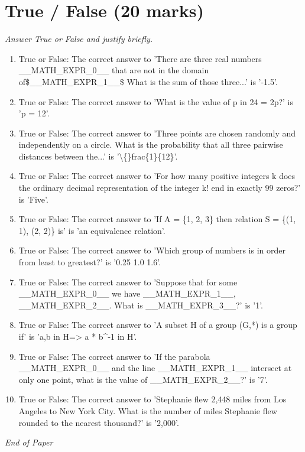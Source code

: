 \documentclass[12pt]{article}
\begin{document}
\section*{True / False (20 marks)}
\textit{Answer True or False and justify briefly.}
\begin{enumerate}[label=\arabic*.]
\item True or False: The correct answer to 'There are three real numbers \_\_MATH\_EXPR\_0\_\_ that are not in the domain of\$\_\_MATH\_EXPR\_1\_\_\$ What is the sum of those three...' is '-1.5'.
\item True or False: The correct answer to 'What is the value of p in 24 = 2p?' is 'p = 12'.
\item True or False: The correct answer to 'Three points are chosen randomly and independently on a circle. What is the probability that all three pairwise distances between the...' is '\textbackslash\{\}frac\{1\}\{12\}'.
\item True or False: The correct answer to 'For how many positive integers k does the ordinary decimal representation of the integer k! end in exactly 99 zeros?' is 'Five'.
\item True or False: The correct answer to 'If A = \{1, 2, 3\} then relation S = \{(1, 1), (2, 2)\} is' is 'an equivalence relation'.
\item True or False: The correct answer to 'Which group of numbers is in order from least to greatest?' is '0.25 1.0 1.6'.
\item True or False: The correct answer to 'Suppose that for some \_\_MATH\_EXPR\_0\_\_ we have \_\_MATH\_EXPR\_1\_\_, \_\_MATH\_EXPR\_2\_\_. What is \_\_MATH\_EXPR\_3\_\_?' is '1'.
\item True or False: The correct answer to 'A subset H of a group (G,*) is a group if' is 'a,b in H=> a * b\^{}-1 in H'.
\item True or False: The correct answer to 'If the parabola \_\_MATH\_EXPR\_0\_\_ and the line \_\_MATH\_EXPR\_1\_\_ intersect at only one point, what is the value of \_\_MATH\_EXPR\_2\_\_?' is '7'.
\item True or False: The correct answer to 'Stephanie flew 2,448 miles from Los Angeles to New York City. What is the number of miles Stephanie flew rounded to the nearest thousand?' is '2,000'.
\end{enumerate}

\vfill
\noindent\textit{End of Paper}
\end{document}
